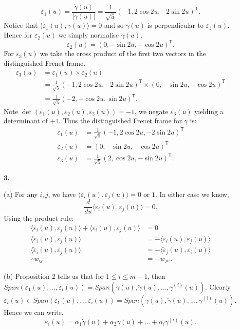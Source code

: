 \documentclass[a4paper]{article}
\newcommand{\ip}[2]{\langle #1, #2 \rangle}
\newcommand{\e}[1]{\varepsilon_{#1}(u)}
\newcommand{\dote}[1]{\dot{\varepsilon}_{#1}(u)}
\begin{document}
\begin{enumerate}[leftmargin=\labelsep]
	$$\varepsilon_1(u) = \frac{\dot{\gamma}(u)}{|\dot{\gamma}(u)|} = \frac{1}{\sqrt{5}}(-1, 2\cos{2u}, -2\sin{2u})^\mathsf{T}.$$
	Notice that $\ip{\varepsilon_1(u)}{\ddot{\gamma}(u)} = 0$ and so $\ddot{\gamma}(u)$ is perpendicular to $\varepsilon_1(u)$. Hence for $\varepsilon_2(u)$ we simply normalise $\ddot{\gamma}(u)$.
	$$\varepsilon_2(u) = (0, -\sin{2u}, -\cos{2u})^{\mathsf{T}}.$$
		For $\varepsilon_3(u)$ we take the cross product of the first two vectors in the distinguished Frenet frame.
	\begin{align*}
		\varepsilon_3(u) & = \varepsilon_1(u) \times \varepsilon_2(u) \\
		& = \frac{1}{\sqrt{5}}(-1, 2\cos{2u}, -2\sin{2u})^\mathsf{T} \times (0, -\sin{2u}, -\cos{2u})^{\mathsf{T}} \\
		& = \frac{1}{\sqrt{5}}(-2, -\cos{2u}, \sin{2u})^\mathsf{T}.
	\end{align*}
		Note $\det(\varepsilon_1(u), \varepsilon_2(u), \varepsilon_3(u)) = -1$, we negate $\varepsilon_3(u)$ yielding a determinant of $+1$. Thus the distinguished Frenet frame for $\gamma$ is:
	\begin{align*}
		\varepsilon_1(u) & = \frac{1}{\sqrt{5}}(-1, 2\cos{2u}, -2\sin{2u})^\mathsf{T} \\
		\varepsilon_2(u) & = (0, -\sin{2u}, -\cos{2u})^{\mathsf{T}} \\
		\varepsilon_3(u) &  = \frac{1}{\sqrt{5}}(2, \cos{2u}, -\sin{2u})^\mathsf{T}.
	\end{align*}
\item[\textbf{3.}]
\item[(a)]
	For any $i, j$, we have $\ip{\varepsilon_i(u)}{\varepsilon_j(u)} = 0$ or $1$. In either case we know,
		$$\frac{d}{du}\ip{\varepsilon_i(u)}{\varepsilon_j(u)} = 0.$$
	Using the product rule:
	\begin{align*}
		\ip{\dote{i}}{\e{j}} + \ip{\e{i}}{\dote{j}} & = 0 \\
		\ip{\dote{i}}{\e{j}} & = - \ip{\e{i}}{\dote{j}} \\
		\ip{\dote{i}}{\e{j}} & = - \ip{\dote{j}}{\e{i}} \\
		\therefore w_{ij} & = - w_{ji}.. 
	\end{align*}
\item[(b)]
	Proposition 2 tells us that for $1 \leq i \leq m - 1$, then $Span(\e{1}, ... , \e{i}) = Span(\dot{\gamma}(u), \ddot{\gamma}(u), ... , \gamma^{(i)}(u))$. Clearly $\e{i} \in Span(\e{1}, ... , \e{i}) = Span(\dot{\gamma}(u), \ddot{\gamma}(u), ... , \gamma^{(i)}(u)).$ Hence we can write,
	$$\e{i} = \alpha_1 \dot{\gamma}(u) + \alpha_2 \ddot{\gamma}(u) + ... + \alpha_i \gamma^{(i)}(u).$$

\end{enumerate}
\end{document}
